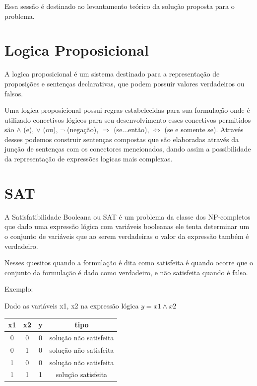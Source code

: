 Essa sessão é destinado ao levantamento teórico da solução proposta para o problema.

\section{Logica Proposicional}

A logica proposicional é um sistema destinado para a representação de proposições e sentenças declarativas, que podem possuir valores verdadeiros ou falsos.

Uma logica proposicional possui regras estabelecidas para sua formulação onde é utilizado conectivos lógicos para seu desenvolvimento esses conectivos permitidos são $\land$ (e), $\lor$ (ou), $\lnot$ (negação), $\Rightarrow$ (se...então), $\iff$ (se e somente se). Através desses podemos construir sentenças compostas que são elaboradas através da junção de sentenças com os conectores mencionados, dando assim a possibilidade da representação de expressões logicas mais complexas.


\section{SAT}

A Satisfatibilidade Booleana ou SAT é um problema da classe dos NP-completos que dado uma expressão lógica com variáveis booleanas ele tenta determinar um o conjunto de variáveis que ao serem verdadeiras o valor da expressão também é verdadeiro.

Nesses quesitos quando a formulação é dita como satisfeita é quando ocorre que o conjunto da formulação é dado como verdadeiro, e não satisfeita quando é falso. 
 


Exemplo:
 
Dado as variáveis x1, x2 na expressão lógica $y = x1 \land x2$

\begin{center}
\begin{tabular}{ |c|c|c|c| } 
\hline
x1 & x2 & y & tipo\\
\hline
0 & 0  & 0 & solução não satisfeita \\ 
0 & 1 & 0  & solução não satisfeita \\ 
1 & 0 & 0  & solução não satisfeita \\
1 & 1 & 1  & solução satisfeita \\
\hline
\end{tabular}
\end{center}

